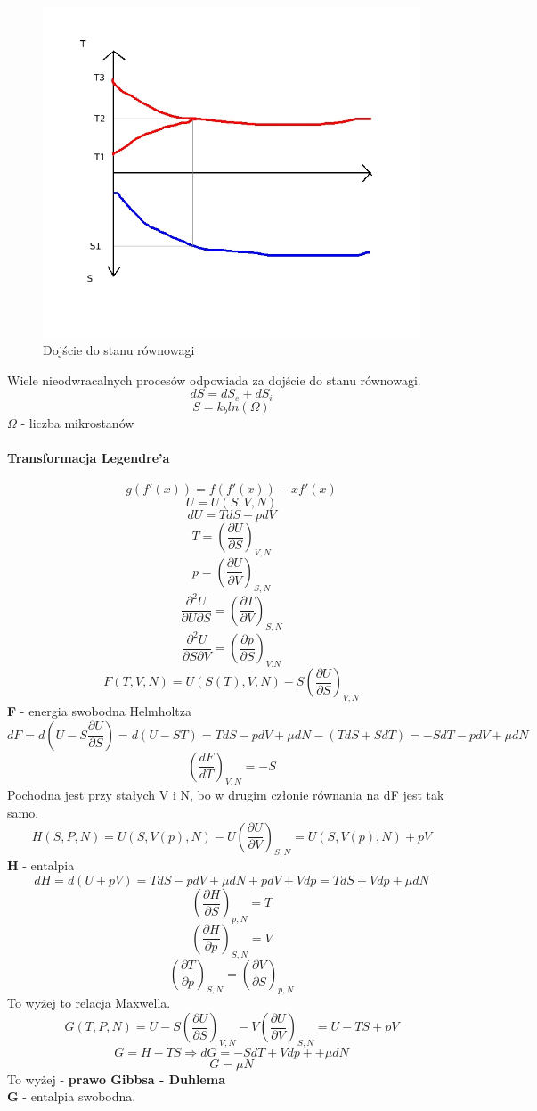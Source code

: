 \documentclass{article}
\begin{document}
			\begin{figure}[ht]
				\label{fig:fig1}
				\centering
				\includegraphics[scale=0.6]{nieodwracalneprocesy.jpeg}
				\caption{Dojście do stanu równowagi}
			\end{figure}
			
			Wiele nieodwracalnych procesów odpowiada za dojście do stanu równowagi.
			$$dS = dS_e + dS_i$$
			$$S = k_b ln(\Omega)$$
			$\Omega$ - liczba mikrostanów
		\paragraph{Transformacja Legendre'a}
			$$g(f'(x)) = f(f'(x)) - xf'(x)$$
			$$U = U(S, V, N)$$
			$$dU = TdS - pdV$$
			$$T = (\frac{\partial U}{\partial S})_{V,N}$$
			$$p = (\frac{\partial U}{\partial V})_{S,N}$$
			$$\frac{\partial^2U}{\partial U \partial S} = (\frac{\partial T}{\partial V})_{S,N}$$
			$$\frac{\partial ^ 2 U}{\partial S \partial V} = (\frac{\partial p}{\partial S})_{V.N}$$
			$$F(T,V,N) = U(S(T), V, N) - S(\frac{\partial U}{\partial S})_{V,N}$$
			\textbf{F} - energia swobodna Helmholtza
			$$dF = d(U - S\frac{\partial U}{\partial S}) = d(U - ST) = TdS - pdV + \mu dN - (TdS + SdT) = -SdT - pdV + \mu dN$$
			$$(\frac{dF}{dT})_{V,N} = -S$$
			Pochodna jest przy stałych V i N, bo w drugim członie równania na dF jest tak samo.
			$$H(S,P,N) = U(S, V(p), N) - U(\frac{\partial U}{\partial V})_{S,N} = U(S, V(p), N) + pV$$
			\textbf{H} - entalpia
			$$dH = d(U + pV) = TdS - pdV + \mu dN + pdV + Vdp = TdS + Vdp + \mu dN$$
			$$(\frac{\partial H}{\partial S})_{p,N} = T$$
			$$(\frac{\partial H}{\partial p})_{S,N} = V$$
			$$(\frac{\partial T}{\partial p})_{S,N} = (\frac{\partial V}{\partial S})_{p,N}$$
			To wyżej to relacja Maxwella.
			$$G(T, P, N) = U - S(\frac{\partial U}{\partial S})_{V,N} - V(\frac{\partial U}{\partial V})_{S,N} = U - TS + pV$$
			$$G = H - TS \Rightarrow dG = -SdT + Vdp ++ \mu dN$$
			$$G = \mu N$$
			To wyżej - \textbf{prawo Gibbsa - Duhlema}\\
			\textbf{G} - entalpia swobodna.
\end{document}
